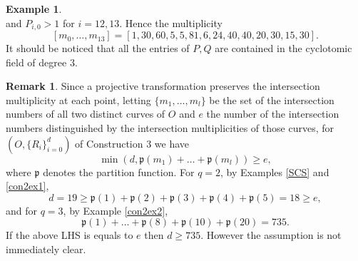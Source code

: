 \documentclass[11pt]{amsart}
\theoremstyle{plain} %
\theoremstyle{definition} %
\newtheorem{ex}[thm]{Example} %
\newtheorem{rem}[thm]{Remark} %
\theoremstyle{remark} %
\begin{document}
\begin{ex}
$$$$ 
and $P_{i,0}>1$ for $i=12,13$. Hence the multiplicity
$$
[m_0,\dots,m_{13}]=
[1, 30, 60, 5, 5, 81, 6, 24, 40, 40, 20, 30, 15, 30 ].
$$
It should be noticed that all the entries of $P,Q$ are contained in the cyclotomic field of degree $3$.
\end{ex}
\begin{rem}
Since a projective transformation preserves the intersection multiplicity at each point, letting $\{m_1,\dots,m_l\}$ be 
the set of the intersection numbers of all two distinct curves of $O$ and $e$ the number of the intersection numbers distinguished by the intersection multiplicities of those curves, for $(O,\{R_i\}_{i=0}^d)$ of Construction 3 we have
$$
\min\left(d,\mathfrak{p}(m_1)+\dots+\mathfrak{p}(m_l)\right)\ge e,
$$
where $\mathfrak{p}$ denotes the partition function. For $q=2$, by Examples \ref{SCS} and \ref{con2ex1},
$$
d=19\ge\mathfrak{p}(1)+\mathfrak{p}(2)+\mathfrak{p}(3)+\mathfrak{p}(4)+\mathfrak{p}(5)=18\ge e,
$$
and for $q=3$, by Example \ref{con2ex2},
$$
\mathfrak{p}(1)+\dots+\mathfrak{p}(8)+\mathfrak{p}(10)+\mathfrak{p}(20)=735.
$$
If the above LHS is equals to $e$ then $d\ge735$. However the assumption is not immediately clear.
\end{rem}








\end{document}
